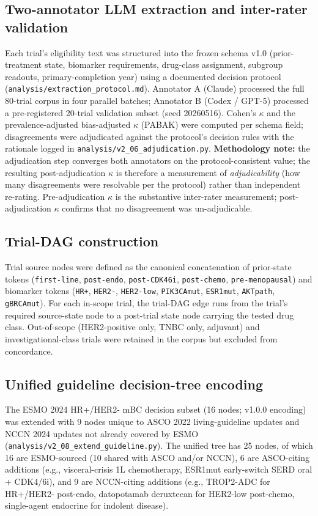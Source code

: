 \documentclass[11pt,a4paper]{article}
\begin{document}
\subsection{Two-annotator LLM extraction and inter-rater validation}
Each trial's eligibility text was structured into the frozen schema v1.0 (prior-treatment state, biomarker requirements, drug-class assignment, subgroup readouts, primary-completion year) using a documented decision protocol (\texttt{analysis/extraction\_protocol.md}). Annotator A (Claude) processed the full 80-trial corpus in four parallel batches; Annotator B (Codex / GPT-5) processed a pre-registered 20-trial validation subset (seed 20260516). Cohen's $\kappa$ and the prevalence-adjusted bias-adjusted $\kappa$ (PABAK) were computed per schema field; disagreements were adjudicated against the protocol's decision rules with the rationale logged in \texttt{analysis/v2\_06\_adjudication.py}. \textbf{Methodology note:} the adjudication step converges both annotators on the protocol-consistent value; the resulting post-adjudication $\kappa$ is therefore a measurement of \emph{adjudicability} (how many disagreements were resolvable per the protocol) rather than independent re-rating. Pre-adjudication $\kappa$ is the substantive inter-rater measurement; post-adjudication $\kappa$ confirms that no disagreement was un-adjudicable.

\subsection{Trial-DAG construction}
Trial source nodes were defined as the canonical concatenation of prior-state tokens (\texttt{first-line}, \texttt{post-endo}, \texttt{post-CDK46i}, \texttt{post-chemo}, \texttt{pre-menopausal}) and biomarker tokens (\texttt{HR+}, \texttt{HER2-}, \texttt{HER2-low}, \texttt{PIK3CAmut}, \texttt{ESR1mut}, \texttt{AKTpath}, \texttt{gBRCAmut}). For each in-scope trial, the trial-DAG edge runs from the trial's required source-state node to a post-trial state node carrying the tested drug class. Out-of-scope (HER2-positive only, TNBC only, adjuvant) and investigational-class trials were retained in the corpus but excluded from concordance.

\subsection{Unified guideline decision-tree encoding}
The ESMO 2024 HR+/HER2- mBC decision subset (16 nodes; v1.0.0 encoding) was extended with 9 nodes unique to ASCO 2022 living-guideline updates and NCCN 2024 updates not already covered by ESMO (\texttt{analysis/v2\_08\_extend\_guideline.py}). The unified tree has 25 nodes, of which 16 are ESMO-sourced (10 shared with ASCO and/or NCCN), 6 are ASCO-citing additions (e.g., visceral-crisis 1L chemotherapy, ESR1mut early-switch SERD oral + CDK4/6i), and 9 are NCCN-citing additions (e.g., TROP2-ADC for HR+/HER2- post-endo, datopotamab deruxtecan for HER2-low post-chemo, single-agent endocrine for indolent disease).
\end{document}
